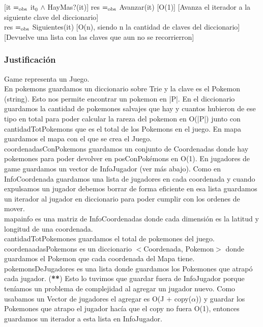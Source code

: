 [it $=_{\mathrm{obs}}$ it$_0$ $\wedge$ HayMas?(it)]
{res $=_{\mathrm{obs}}$ Avanzar(it)}
[O(1)]
[Avanza el iterador a la siguiente clave del diccionario]\\

{res $=_{\mathrm{obs}}$ Siguientes(it)}
[O(n), siendo n la cantidad de claves del diccionario]
[Devuelve una lista con las claves que aun no se recorrierron]\\

\begin{Representacion}

\subsubsection{Justificación}
Game representa un Juego.\\
En pokemons guardamos un diccionario sobre Trie y la clave es el Pokemon (string). Esto nos permite encontrar un pokemon en |P|. En el diccionario guardamos la cantidad de pokemones salvajes que hay y cuantos hubieron de ese tipo en total para poder calcular la rareza del pokemon en O(|P|) junto con cantidadTotPokemons que es el total de los Pokemons en el juego.
En mapa guardamos el mapa con el que se crea el Juego.\\
coordenadasConPokemons guardamos un conjunto de Coordenadas donde hay pokemones para poder devolver en posConPok\'emons en O(1).
En jugadores de game guardamos un vector de InfoJugador (ver m\'as abajo). Como en InfoCoordenada guardamos una lista de jugadores en cada coordenada y cuando expulsamos un jugador debemos borrar de forma eficiente en esa lista guardamos un iterador al jugador en diccionario para poder cumplir con los ordenes de mover.\\
mapainfo es una matriz de InfoCoordenadas donde cada dimensi\'on es la latitud y longitud de una coordenada.\\
cantidadTotPokemones guardamos el total de pokemones del juego.\\
coordenaadasPokemons es un diccionario $<$Coordenada, Pokemon$>$ donde guardamos el Pokemon que cada coordenada del Mapa tiene.\\
pokemonsDeJugadores es una lista donde guardamos los Pokemones que atrapó cada jugador. (\textbf{**}) Esto lo tuvimos que guardar fuera de InfoJugador porque ten\'iamos un problema de complejidad al agregar un jugador nuevo. Como usabamos un Vector de jugadores el agregar es O(J + copy($\alpha$)) y guardar los Pokemones que atrapo el jugador hacía que el copy no fuera O(1), entonces guardamos un iterador a esta lista en InfoJugador.\\

\end{Representacion}
